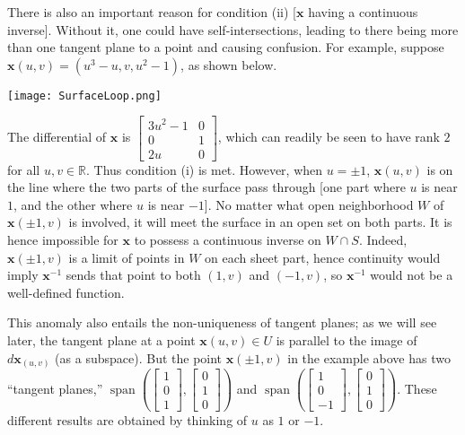 \documentclass[leqno]{book}
\begin{document}
There is also an important reason for condition (ii) [$\mathbf x$ having a continuous inverse].  Without it, one could have self-intersections, leading to there being more than one tangent plane to a point and causing confusion.  For example, suppose $\mathbf x(u,v)=(u^3-u,v,u^2-1)$, as shown below.
\begin{center}
\texttt{[image: SurfaceLoop.png]}
\end{center}
The differential of $\mathbf x$ is $\begin{bmatrix}3u^2-1&0\\0&1\\2u&0\end{bmatrix}$, which can readily be seen to have rank $2$ for all $u,v\in\mathbb R$.  Thus condition (i) is met.  However, when $u=\pm 1$, $\mathbf x(u,v)$ is on the line where the two parts of the surface pass through [one part where $u$ is near $1$, and the other where $u$ is near $-1$].  No matter what open neighborhood $W$ of $\mathbf x(\pm 1,v)$ is involved, it will meet the surface in an open set on both parts.  It is hence impossible for $\mathbf x$ to possess a continuous inverse on $W\cap S$.  Indeed, $\mathbf x(\pm 1,v)$ is a limit of points in $W$ on each sheet part, hence continuity would imply $\mathbf x^{-1}$ sends that point to both $(1,v)$ and $(-1,v)$, so $\mathbf x^{-1}$ would not be a well-defined function.

This anomaly also entails the non-uniqueness of tangent planes; as we will see later, the tangent plane at a point $\mathbf x(u,v)\in U$ is parallel to the image of $d\mathbf x_{(u,v)}$ (as a subspace).  But the point $\mathbf x(\pm 1,v)$ in the example above has two ``tangent planes,'' $\operatorname{span}\left(\begin{bmatrix}1\\0\\1\end{bmatrix},\begin{bmatrix}0\\1\\0\end{bmatrix}\right)$ and $\operatorname{span}\left(\begin{bmatrix}1\\0\\-1\end{bmatrix},\begin{bmatrix}0\\1\\0\end{bmatrix}\right)$.  These different results are obtained by thinking of $u$ as $1$ or $-1$.
\end{document}
